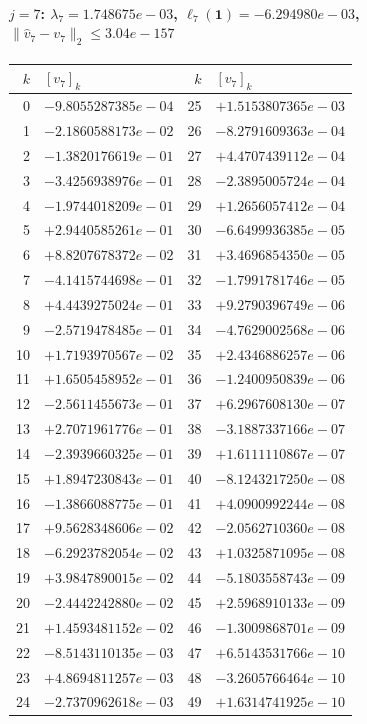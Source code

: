 \documentclass[11pt]{article}
\begin{document}
\paragraph{$j = 7$: $\lambda_{7} = 1.748675e-03$, \quad $\ell_{7}(\mathbf{1}) = -6.294980e-03$, \quad $\|\hat{v}_{7} - v_{7}\|_2 \leq 3.04e-157$}
\begin{center}
{\footnotesize
\begin{tabular}{r@{\;\;}l@{\quad}r@{\;\;}l}
\toprule
$k$ & $[v_{7}]_k$ & $k$ & $[v_{7}]_k$ \\
\midrule
0 & $-9.8055287385e-04$ & 25 & $+1.5153807365e-03$ \\
1 & $-2.1860588173e-02$ & 26 & $-8.2791609363e-04$ \\
2 & $-1.3820176619e-01$ & 27 & $+4.4707439112e-04$ \\
3 & $-3.4256938976e-01$ & 28 & $-2.3895005724e-04$ \\
4 & $-1.9744018209e-01$ & 29 & $+1.2656057412e-04$ \\
5 & $+2.9440585261e-01$ & 30 & $-6.6499936385e-05$ \\
6 & $+8.8207678372e-02$ & 31 & $+3.4696854350e-05$ \\
7 & $-4.1415744698e-01$ & 32 & $-1.7991781746e-05$ \\
8 & $+4.4439275024e-01$ & 33 & $+9.2790396749e-06$ \\
9 & $-2.5719478485e-01$ & 34 & $-4.7629002568e-06$ \\
10 & $+1.7193970567e-02$ & 35 & $+2.4346886257e-06$ \\
11 & $+1.6505458952e-01$ & 36 & $-1.2400950839e-06$ \\
12 & $-2.5611455673e-01$ & 37 & $+6.2967608130e-07$ \\
13 & $+2.7071961776e-01$ & 38 & $-3.1887337166e-07$ \\
14 & $-2.3939660325e-01$ & 39 & $+1.6111110867e-07$ \\
15 & $+1.8947230843e-01$ & 40 & $-8.1243217250e-08$ \\
16 & $-1.3866088775e-01$ & 41 & $+4.0900992244e-08$ \\
17 & $+9.5628348606e-02$ & 42 & $-2.0562710360e-08$ \\
18 & $-6.2923782054e-02$ & 43 & $+1.0325871095e-08$ \\
19 & $+3.9847890015e-02$ & 44 & $-5.1803558743e-09$ \\
20 & $-2.4442242880e-02$ & 45 & $+2.5968910133e-09$ \\
21 & $+1.4593481152e-02$ & 46 & $-1.3009868701e-09$ \\
22 & $-8.5143110135e-03$ & 47 & $+6.5143531766e-10$ \\
23 & $+4.8694811257e-03$ & 48 & $-3.2605766464e-10$ \\
24 & $-2.7370962618e-03$ & 49 & $+1.6314741925e-10$ \\
\bottomrule
\end{tabular}
}
\end{center}
\end{document}
